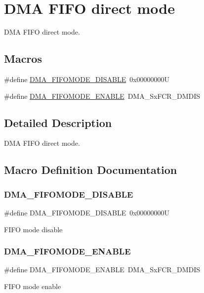 \hypertarget{group___d_m_a___f_i_f_o__direct__mode}{}\section{D\+MA F\+I\+FO direct mode}
\label{group___d_m_a___f_i_f_o__direct__mode}


D\+MA F\+I\+FO direct mode.  


\subsection*{Macros}
\begin{DoxyCompactItemize}
\item 
\#define \mbox{\hyperlink{group___d_m_a___f_i_f_o__direct__mode_gaec22b199f9da9214bf908d7edbcd83e8}{D\+M\+A\+\_\+\+F\+I\+F\+O\+M\+O\+D\+E\+\_\+\+D\+I\+S\+A\+B\+LE}}~0x00000000U
\item 
\#define \mbox{\hyperlink{group___d_m_a___f_i_f_o__direct__mode_ga18709570bed6b9112520701c482fbe4b}{D\+M\+A\+\_\+\+F\+I\+F\+O\+M\+O\+D\+E\+\_\+\+E\+N\+A\+B\+LE}}~D\+M\+A\+\_\+\+Sx\+F\+C\+R\+\_\+\+D\+M\+D\+IS
\end{DoxyCompactItemize}


\subsection{Detailed Description}
D\+MA F\+I\+FO direct mode. 



\subsection{Macro Definition Documentation}
\mbox{\label{group___d_m_a___f_i_f_o__direct__mode_gaec22b199f9da9214bf908d7edbcd83e8}} 
\subsubsection{\texorpdfstring{DMA\_FIFOMODE\_DISABLE}{DMA\_FIFOMODE\_DISABLE}}
{\footnotesize\ttfamily \#define D\+M\+A\+\_\+\+F\+I\+F\+O\+M\+O\+D\+E\+\_\+\+D\+I\+S\+A\+B\+LE~0x00000000U}

F\+I\+FO mode disable \mbox{\label{group___d_m_a___f_i_f_o__direct__mode_ga18709570bed6b9112520701c482fbe4b}} 
\subsubsection{\texorpdfstring{DMA\_FIFOMODE\_ENABLE}{DMA\_FIFOMODE\_ENABLE}}
{\footnotesize\ttfamily \#define D\+M\+A\+\_\+\+F\+I\+F\+O\+M\+O\+D\+E\+\_\+\+E\+N\+A\+B\+LE~D\+M\+A\+\_\+\+Sx\+F\+C\+R\+\_\+\+D\+M\+D\+IS}

F\+I\+FO mode enable 